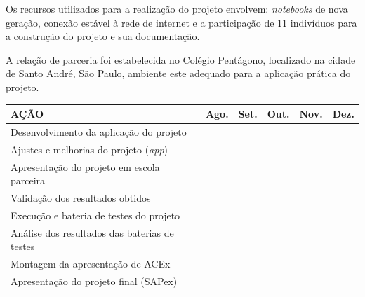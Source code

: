 Os recursos utilizados para a realização do projeto envolvem: \textit{notebooks}
de nova geração, conexão estável à rede de internet e a participação de 11
indivíduos para a construção do projeto e sua documentação.

A relação de parceria foi estabelecida no Colégio Pentágono, localizado na cidade
de Santo André, São Paulo, ambiente este adequado para a aplicação prática do
projeto.

\singlespacing
\begin{center}
\begin{tabular}{|>{\raggedright\arraybackslash}p{5.5cm}|c|c|c|c|c|}
\hline
\textbf{AÇÃO} & \textbf{Ago.} & \textbf{Set.} & \textbf{Out.} & \textbf{Nov.} &
\textbf{Dez.}\\
\hline
Desenvolvimento da aplicação do projeto & & & & & \\
\hline
Ajustes e melhorias do projeto (\textit{app}) & & & & & \\
\hline
Apresentação do projeto em escola parceira & & & & & \\
\hline
Validação dos resultados obtidos & & & & & \\
\hline
Execução e bateria de testes do projeto & & & & & \\
\hline
Análise dos resultados das baterias de testes & & & & & \\
\hline
Montagem da apresentação de ACEx & & & & & \\
\hline
Apresentação do projeto final (SAPex) & & & & & \\
\hline
\end{tabular}
\end{center}
\onehalfspacing

